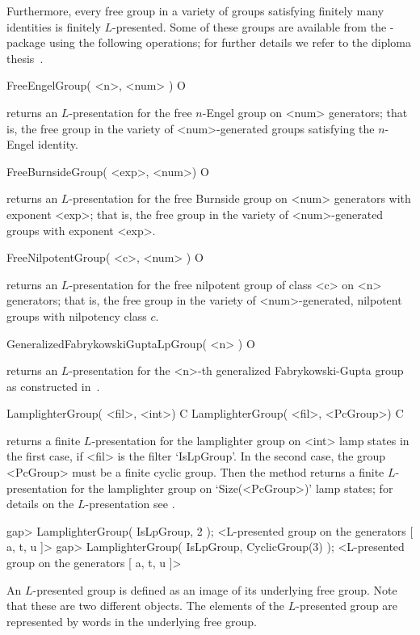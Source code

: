 Furthermore, every free group in a variety of groups satisfying finitely
many identities is finitely $L$-presented. Some of these groups are
available from the \NQL-package using the following operations; for
further details we refer to the diploma thesis~\cite{H08}.

\> FreeEngelGroup( <n>, <num> ) O

returns an $L$-presentation for the free $n$-Engel group on <num>
generators; that is, the free group in the variety of <num>-generated
groups satisfying the $n$-Engel identity.

\> FreeBurnsideGroup( <exp>, <num>) O

returns an $L$-presentation for the free Burnside group on <num>
generators with exponent <exp>; that is, the free group in the variety
of <num>-generated groups with exponent <exp>.

\> FreeNilpotentGroup( <c>, <num> ) O

returns an $L$-presentation for the free nilpotent group of class <c> on
<n> generators; that is, the free group in the variety of <num>-generated,
nilpotent groups with nilpotency class $c$.

\> GeneralizedFabrykowskiGuptaLpGroup( <n> ) O

returns an $L$-presentation for the <n>-th generalized Fabrykowski-Gupta 
group as constructed in~\cite{BEH08}.

\> LamplighterGroup( <fil>, <int>) C
\> LamplighterGroup( <fil>, <PcGroup>) C

returns a finite $L$-presentation for the lamplighter group on <int>
lamp states in the first case, if <fil> is the filter `IsLpGroup'. In
the second case, the group <PcGroup> must be a finite cyclic group. Then
the method returns a finite $L$-presentation for the lamplighter group
on `Size(<PcGroup>)' lamp states; for details on the $L$-presentation
see \cite{Bartholdi03}.

\beginexample
gap> LamplighterGroup( IsLpGroup, 2 );
<L-presented group on the generators [ a, t, u ]>
gap> LamplighterGroup( IsLpGroup, CyclicGroup(3) );
<L-presented group on the generators [ a, t, u ]>
\endexample



An $L$-presented group is defined as an image of its underlying free
group.  Note that these are two different {\GAP} objects. The elements
of the $L$-presented group are represented by words in the underlying
free group.

